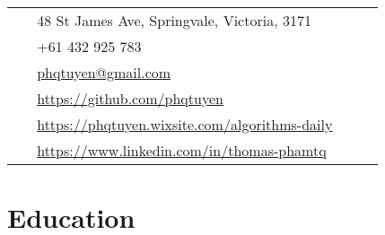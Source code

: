 \documentclass[12pt]{article} %
\begin{document}
\begin{paracol}{2}
\parbox[top][0.16\textheight][c]{\linewidth}{ %
	\vspace{-0.04\textheight} %
	\colorbox{shade}{ %
		\begin{supertabular}{p{0.05\linewidth}|p{0.775\linewidth}} %
			\raisebox{-1pt}{\faHome} & 48 St James Ave, Springvale, Victoria, 3171 \\ %
			\raisebox{-1pt}{\faPhone} & +61 432 925 783 \\ %
			\raisebox{0pt}{\small\faEnvelope} & \href{mailto:phqtuyen@gmail.com}{phqtuyen@gmail.com} \\ %
			\raisebox{-1pt}{\small\faDesktop} & \href{https://github.com/phqtuyen}{https://github.com/phqtuyen} \\ %
			\raisebox{-1pt}{\small\faDesktop} & \href{https://phqtuyen.wixsite.com/algorithms-daily}{https://phqtuyen.wixsite.com/algorithms-daily} \\
			\raisebox{-1pt}{\faLinkedinSquare} & \href{https://www.linkedin.com/in/thomas-phamtq}{https://www.linkedin.com/in/thomas-phamtq} \\ %
		\end{supertabular}
	}
}


\section{Education} 





\end{paracol}
\end{document}
